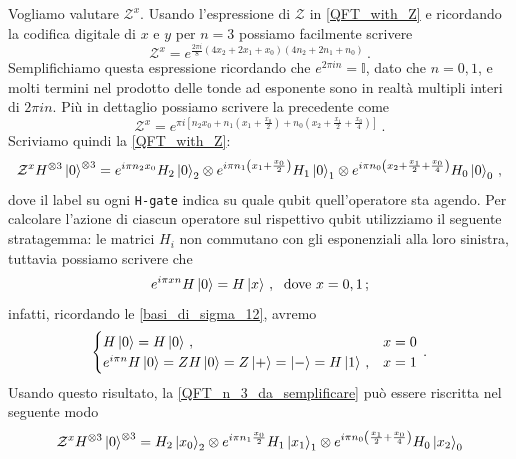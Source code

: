 \begin{esempio}
Vogliamo valutare $\mathcal{Z}^x$. Usando l'espressione di $\mathcal{Z}$ in \eqref{QFT_with_Z} e ricordando la codifica digitale di $x$ e $y$ per $n = 3$ possiamo facilmente scrivere
\begin{equation*}
    \mathcal{Z}^x = e^{\frac{2 \pi i}{8} (4 x_2 + 2 x_1 + x_0 ) ( 4 n_2 + 2 n_1 + n_0 ) } \, .
\end{equation*}
Semplifichiamo questa espressione ricordando che $e^{2\pi i n} = \mathbb{I}$, dato che $n = 0,1$, e molti termini nel prodotto delle tonde ad esponente sono in realtà multipli interi di $2 \pi i n$. Più in dettaglio possiamo scrivere la precedente come
\begin{equation*}
    \mathcal{Z}^x = e^{\pi i \left[ n_2 x_0 + n_1 \left( x_1 + \frac{x_0}{2} \right) + n_0 \left( x_2 + \frac{x_1}{2} + \frac{x_0}{4} \right) \right]} \, .
\end{equation*}
Scriviamo quindi la \eqref{QFT_with_Z}:
\begin{equation}\label{QFT_n_3_da_semplificare}
    \mathcal{Z}^x H^{\otimes 3} \ket{0}^{\otimes 3} = e^{i \pi n_2 x_0} H_2 \ket{0}_2 \otimes e^{i \pi n_1 \left( x_1 + \frac{x_0}{2} \right)} H_1 \ket{0}_1 \otimes e^{i \pi n_0 \left( x_2 + \frac{x_1}{2} + \frac{x_0}{4} \right)} H_0\ket{0}_0 \, ,
\end{equation}
dove il label su ogni \texttt{H-gate} indica su quale qubit quell'operatore sta agendo. Per calcolare l'azione di ciascun operatore sul rispettivo qubit utilizziamo il seguente stratagemma: le matrici $H_i$ non commutano con gli esponenziali alla loro sinistra, tuttavia possiamo scrivere che
\begin{equation*}
    e^{i \pi x n} H \ket 0 = H \ket x \, , \; \text{ dove } x = 0, 1 \, ;
\end{equation*}
infatti, ricordando le \eqref{basi_di_sigma_12}, avremo
\begin{equation*}
    \begin{cases}
        H\ket 0 = H \ket 0 \, , & x = 0 \\
        e^{i \pi n} H \ket{0} = Z H \ket{0} = Z \ket{+} = \ket{-} = H \ket{1} \, , &x = 1
    \end{cases} \, .
\end{equation*}
Usando questo risultato, la \eqref{QFT_n_3_da_semplificare} può essere riscritta nel seguente modo 
\begin{align*}
    \mathcal{Z}^xH^{\otimes 3}\ket{0}^{\otimes 3} &= H_2 \ket{x_0}_2 \otimes e^{i\pi n_1 \frac{x_0}{2}} H_1 \ket{x_1}_1 \otimes e^{i \pi n_0 \left( \frac{x_1}{2} + \frac{x_0}{4} \right)} H_0 \ket{x_2}_0 \\

\end{align*}
\end{esempio}
